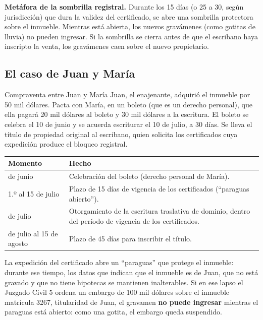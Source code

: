 \documentclass[12pt,oneside]{book}
\begin{document}
\begin{nota}
\textbf{Metáfora de la sombrilla registral.} Durante los 15 días (o 25 a 30, según jurisdicción) que dura la validez del certificado, se abre una sombrilla protectora sobre el inmueble. Mientras está abierta, los nuevos gravámenes (como gotitas de lluvia) no pueden ingresar. Si la sombrilla se cierra antes de que el escribano haya inscripto la venta, los gravámenes caen sobre el nuevo propietario.
\end{nota}

\subsection{El caso de Juan y María}

\begin{ejemplo}{Compraventa entre Juan y María}
Juan, el enajenante, adquirió el inmueble por 50 mil dólares. Pacta con María, en un boleto (que es un derecho personal), que ella pagará 20 mil dólares al boleto y 30 mil dólares a la escritura. El boleto se celebra el 10 de junio y se acuerda escriturar el 10 de julio, a 30 días. Se lleva el título de propiedad original al escribano, quien solicita los certificados cuya expedición produce el bloqueo registral.
\end{ejemplo}

\begin{table}[H]
\centering
\begin{tabularx}{\textwidth}{@{}>{\raggedright\arraybackslash}p{}>{\raggedright\arraybackslash}X@{}}
\toprule
\textbf{Momento} & \textbf{Hecho} \\
\midrule
10 de junio & Celebración del boleto (derecho personal de María). \\
1.º al 15 de julio & Plazo de 15 días de vigencia de los certificados (``paraguas abierto''). \\
10 de julio & Otorgamiento de la escritura traslativa de dominio, dentro del período de vigencia de los certificados. \\
10 de julio al 15 de agosto & Plazo de 45 días para inscribir el título. \\
\bottomrule
\end{tabularx}
\end{table}

La expedición del certificado abre un ``paraguas'' que protege el inmueble: durante ese tiempo, los datos que indican que el inmueble es de Juan, que no está gravado y que no tiene hipotecas se mantienen inalterables. Si en ese lapso el Juzgado Civil 5 ordena un embargo de 100 mil dólares sobre el inmueble matrícula 3267, titularidad de Juan, el gravamen \textbf{no puede ingresar} mientras el paraguas está abierto: como una gotita, el embargo queda suspendido.
\end{document}
